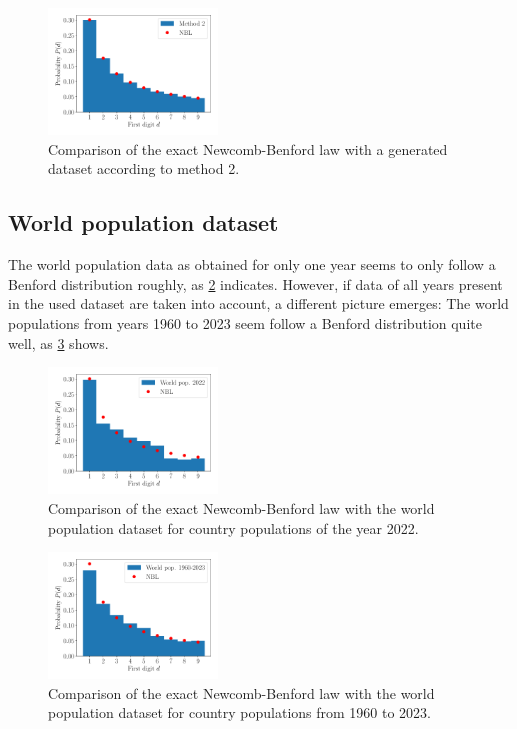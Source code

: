 \documentclass[a4paper,11pt, twocolumn]{article}
\begin{document}
\begin{figure}[h]
	\centering
	\includegraphics[width=0.4\textwidth]{figures/gen_method_2.pdf}
	\caption{Comparison of the exact Newcomb-Benford law with a generated dataset according to method 2.}
	\label{fig:gen_method_2}
\end{figure}

\subsection{World population dataset}
The world population data as obtained for only one year seems to only follow a Benford distribution roughly, as \cref{fig:pop_2022} indicates. However, if data of all years present in the used dataset are taken into account, a different picture emerges: The world populations from years 1960 to 2023 seem follow a Benford distribution quite well, as \cref{fig:pop_1960_2023} shows.

\begin{figure}[h]
	\centering
	\includegraphics[width=0.4\textwidth]{figures/pop_2022.pdf}
	\caption{Comparison of the exact Newcomb-Benford law with the world population dataset for country populations of the year 2022.}
	\label{fig:pop_2022}
\end{figure}

\begin{figure}[h]
	\centering
	\includegraphics[width=0.4\textwidth]{figures/pop_1960_2023.pdf}
	\caption{Comparison of the exact Newcomb-Benford law with the world population dataset for country populations from 1960 to 2023.}
	\label{fig:pop_1960_2023}
\end{figure}
\end{document}
